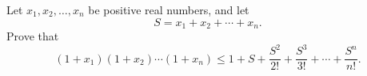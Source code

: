 Let $x_1,x_2,\ldots,x_n$ be positive real numbers, and let \[S=x_1+x_2+\cdots+x_n.\] Prove that \[\left(1+x_1\right)\left(1+x_2\right)\cdots\left(1+x_n\right)\leq1+S+\frac{S^2}{2!}+\frac{S^3}{3!}+\cdots+\frac{S^n}{n!}.\]